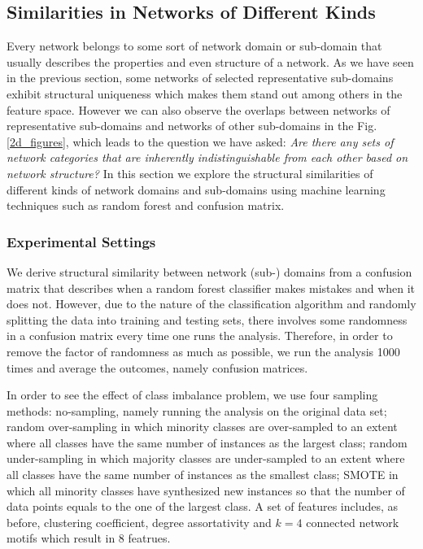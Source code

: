 \documentclass{article}
\begin{document}
\subsection{Similarities in Networks of Different Kinds}
Every network belongs to some sort of network domain or sub-domain that usually describes the properties and even structure of a network. As we have seen in the previous section, some networks of selected representative sub-domains exhibit structural uniqueness which makes them stand out among others in the feature space. However we can also observe the overlaps between networks of representative sub-domains and networks of other sub-domains in the Fig. \ref{2d_figures}, which leads to the question we have asked:  \textit{Are there any sets of network categories that are inherently indistinguishable from each other based on network structure?} In this section we explore the structural similarities of different kinds of network domains and sub-domains using machine learning techniques such as random forest and confusion matrix.  

\subsubsection{Experimental Settings}
We derive structural similarity between network (sub-) domains from a confusion matrix that describes when a random forest classifier makes mistakes and when it does not. However, due to the nature of the classification algorithm and randomly splitting the data into training and testing sets, there involves some randomness in a confusion matrix every time one runs the analysis. Therefore, in order to remove the factor of randomness as much as possible, we run the analysis 1000 times and average the outcomes, namely confusion matrices. 

In order to see the effect of class imbalance problem, we use four sampling methods: no-sampling, namely running the analysis on the original data set; random over-sampling in which minority classes are over-sampled to an extent where all classes have the same number of instances as the largest class; random under-sampling in which majority classes are under-sampled to an extent where all classes have the same number of instances as the smallest class; SMOTE in which all minority classes have synthesized new instances so that the number of data points equals to the one of the largest class. A set of features includes, as before, clustering coefficient, degree assortativity and $k = 4$ connected network motifs which result in 8 featrues.
 
\end{document}
